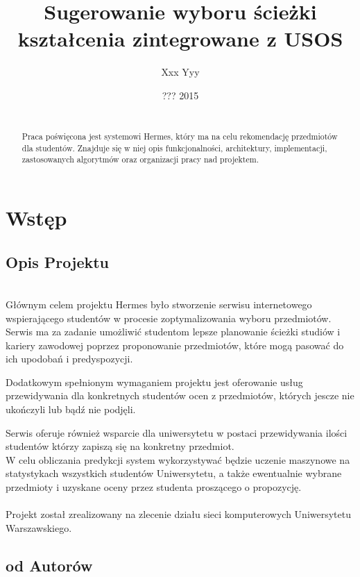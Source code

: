 \documentclass[licencjacka]{pracamgr}
\author{Xxx Yyy}
\title{Sugerowanie wyboru ścieżki kształcenia zintegrowane z USOS}
\date{??? 2015}
\begin{document}
\maketitle
\begin{abstract} ~\\ \indent
Praca poświęcona jest systemowi Hermes, który ma na celu rekomendację przedmiotów dla studentów. Znajduje się w niej opis funkcjonalności, architektury, implementacji, zastosowanych algorytmów oraz organizacji pracy nad projektem.
\end{abstract}
\tableofcontents
\chapter{Wstęp}


 \section{Opis Projektu}


~\\ \indent Głównym celem projektu Hermes było stworzenie serwisu internetowego 
wspierającego studentów w procesie zoptymalizowania wyboru przedmiotów.
Serwis ma za zadanie 
umożliwić studentom lepsze planowanie ścieżki studiów i kariery zawodowej
poprzez proponowanie przedmiotów, które mogą pasować do ich upodobań i predyspozycji. 

Dodatkowym spełnionym wymaganiem projektu jest oferowanie usług przewidywania dla konkretnych studentów ocen z przedmiotów, których jescze nie ukończyli lub bądź nie podjęli.

Serwis oferuje również wsparcie dla uniwersytetu w postaci
przewidywania ilości studentów którzy zapiszą się na konkretny przedmiot. \\
\indent W celu obliczania predykcji system wykorzystywać będzie uczenie maszynowe na statystykach wszystkich studentów Uniwersytetu, a także ewentualnie wybrane przedmioty i uzyskane oceny przez studenta proszącego o propozycję. \\ \\
\indent Projekt został zrealizowany na zlecenie działu sieci komputerowych Uniwersytetu Warszawskiego.
\newpage
\section{od Autorów}
\end{document}
